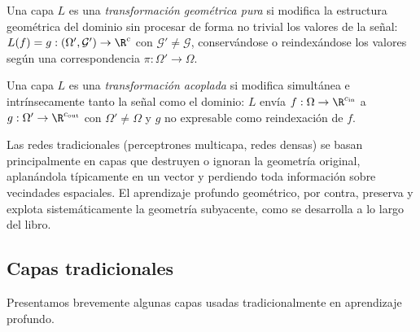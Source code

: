 \begin{definition}
\label{def:found:geometry-transform}
Una capa $L$ es una \emph{transformaci\'on geom\'etrica pura} si modifica la
estructura geom\'etrica del dominio sin procesar de forma no trivial los valores de
la se\~nal: $L(f) = g : (\Omega', \mathcal{G}') \to \R^c$ con $\mathcal{G}' \ne
\mathcal{G}$, conserv\'andose o reindex\'andose los valores seg\'un una
correspondencia $\pi : \Omega' \to \Omega$.
\end{definition}

\begin{definition}
\label{def:found:coupled-transform}
Una capa $L$ es una \emph{transformaci\'on acoplada} si modifica simult\'anea e
intr\'insecamente tanto la se\~nal como el dominio: $L$ env\'ia $f : \Omega \to
\R^{c_{\mathrm{in}}}$ a $g : \Omega' \to \R^{c_{\mathrm{out}}}$ con $\Omega' \ne
\Omega$ y $g$ no expresable como reindexaci\'on de $f$.
\end{definition}

Las redes tradicionales (perceptrones multicapa, redes densas) se basan
principalmente en capas que destruyen o ignoran la geometr\'ia original,
aplan\'andola t\'ipicamente en un vector y perdiendo toda informaci\'on sobre
vecindades espaciales. El aprendizaje profundo geom\'etrico, por contra, preserva y
explota sistem\'aticamente la geometr\'ia subyacente, como se desarrolla a lo largo
del libro.

\subsection{Capas tradicionales}
\label{sec:found:traditional-layers}

Presentamos brevemente algunas capas usadas tradicionalmente en aprendizaje
profundo.

